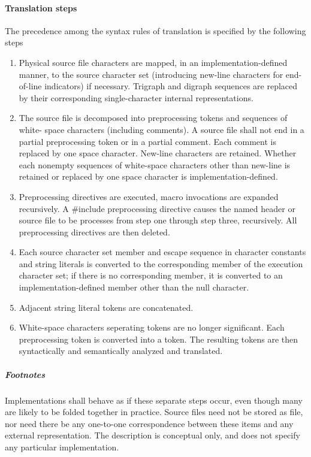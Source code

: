\documentclass{article}
\begin{document}
\paragraph*{Translation steps}
The precedence among the syntax rules of translation is specified by the following steps
\begin{enumerate}
	\item Physical source file characters are mapped, in an implementation-defined manner,
	      to the source character set (introducing new-line characters for end-of-line
	      indicators) if necessary.  Trigraph and digraph sequences are replaced by their
	      corresponding single-character internal representations.
	\item The source file is decomposed into preprocessing tokens and sequences of white-
	      space characters (including comments). A source file shall not end in a partial
	      preprocessing token or in a partial comment. Each comment is replaced by one
	      space character. New-line characters are retained. Whether each nonempty
	      sequences of white-space characters other than new-line is retained or replaced
	      by one space character is implementation-defined.
	\item Preprocessing directives are executed, macro invocations are expanded 
	      recursively. A \#include preprocessing directive causes the named header or
	      source file to be processes from step one through step three, recursively. All
	      preprocessing directives are then deleted.
	\item Each source character set member and escape sequence in character constants and
	      string literals is converted to the corresponding member of the execution
	      character set; if there is no corresponding member, it is converted to an
	      implementation-defined member other than the null character.
	\item Adjacent string literal tokens are concatenated.
	\item White-space characters seperating tokens are no longer significant. Each
	      preprocessing token is converted into a token. The resulting tokens are then
	      syntactically and semantically analyzed and translated.	    		      
\end{enumerate}
\subparagraph*{Footnotes}
Implementations shall behave as if these separate steps occur, even though many are likely
to be folded together in practice. Source files need not be stored as file, nor need there
be any one-to-one correspondence between these items and any external representation. The
description is conceptual only, and does not specify any particular implementation.
\end{document}
